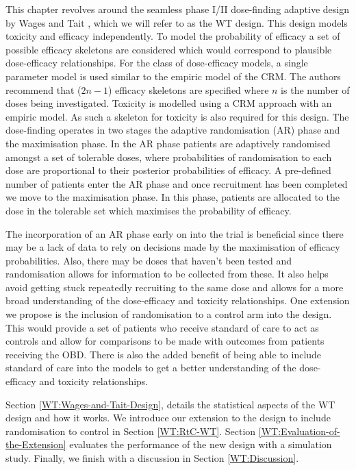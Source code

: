 This chapter revolves around the seamless phase \RN{1}/\RN{2} dose-finding adaptive design by Wages and Tait \cite{wagesSeamlessPhaseII2015}, which we will refer to as the WT design. This design models toxicity and efficacy independently. To model the probability of efficacy a set of possible efficacy skeletons are considered which would correspond to plausible dose-efficacy relationships. For the class of dose-efficacy models, a single parameter model is used similar to the empiric model of the CRM. The authors recommend that ($2n - 1$) efficacy skeletons are specified where $n$ is the number of doses being investigated. Toxicity is modelled using a CRM approach with an empiric model. As such a skeleton for toxicity is also required for this design. The dose-finding operates in two stages the adaptive randomisation (AR) phase and the maximisation phase. In the AR phase patients are adaptively randomised amongst a set of tolerable doses, where probabilities of randomisation to each dose are proportional to their posterior probabilities of efficacy. A pre-defined number of patients enter the AR phase and once recruitment has been completed we move to the maximisation phase. In this phase, patients are allocated to the dose in the tolerable set which maximises the probability of efficacy.  

The incorporation of an AR phase early on into the trial is beneficial since there may be a lack of data to rely on decisions made by the maximisation of efficacy probabilities. Also, there may be doses that haven't been tested and randomisation allows for information to be collected from these. It also helps avoid getting stuck repeatedly recruiting to the same dose and allows for a more broad understanding of the dose-efficacy and toxicity relationships. One extension we propose is the inclusion of randomisation to a control arm into the design. This would provide a set of patients who receive standard of care to act as controls and allow for comparisons to be made with outcomes from patients receiving the OBD. There is also the added benefit of being able to include standard of care into the models to get a better understanding of the dose-efficacy and toxicity relationships.  

Section \ref{WT:Wages-and-Tait-Design}, details the statistical aspects of the WT design and how it works. We introduce our extension to the design to include randomisation to control in Section \ref{WT:RtC-WT}. Section \ref{WT:Evaluation-of-the-Extension} evaluates the performance of the new design with a simulation study. Finally, we finish with a discussion in Section \ref{WT:Discussion}.  



